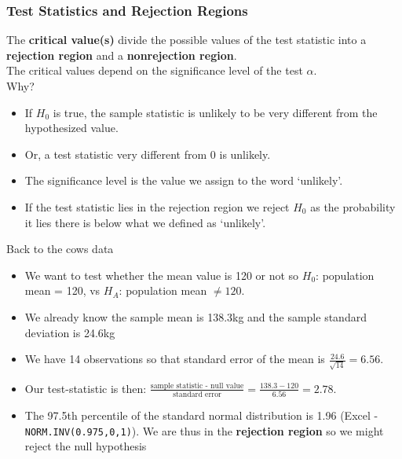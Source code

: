 \documentclass[12pt,xcolor=dvipsnames,handout,mathserif,aspectratio=169]{beamer}
\newcommand{\bbl}[1]{{\color{NavyBlue} \textbf{#1}}}
\newcommand{\bre}[1]{{\color{red} \textbf{#1}}}
\begin{document}
\begin{frame}
\frametitle{Test Statistics and Rejection Regions}
The \bbl{critical value(s)} divide the possible values of the test statistic into a \bbl{rejection region} and a \bbl{nonrejection region}.\\
\vspace*{0.5cm}
The critical values depend on the significance level of the test $\alpha$.\\
\vspace*{0.5cm}
Why?
\begin{itemize}
\item If $H_0$ is true, the sample statistic is unlikely to be very different from the hypothesized value.\\
\item Or, a test statistic very different from 0 is unlikely.\\
\item The significance level is the value we assign to the word `unlikely'.\\
\item If the test statistic lies in the rejection region we reject $H_0$ as the probability it lies there is below
what we defined as `unlikely'.\\
\end{itemize}
\end{frame}

\begin{frame}{Back to the cows data}

\begin{itemize}
\item We want to test whether the mean value is 120 or not so $H_0$: population mean = 120, vs $H_A$: population mean $\ne 120$.\\
\item We already know the sample mean is 138.3kg and the sample standard deviation is 24.6kg
\item We have 14 observations so that standard error of the mean is $\frac{24.6}{\sqrt{14}} = 6.56$.\\
\item Our test-statistic is then: $\frac{\mbox{sample statistic - null value}}{\mbox{standard error}} = \frac{138.3 - 120}{6.56} = 2.78.$
\item The 97.5th percentile of the standard normal distribution is 1.96 (Excel - \texttt{NORM.INV(0.975,0,1)}). We are thus in the \bre{rejection region} so we might reject the null hypothesis
\end{itemize}
\end{frame}
\end{document}
